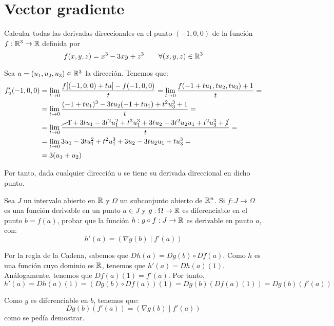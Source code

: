 \section{Vector gradiente}

\begin{ejercicio}
    Calcular todas las derivadas direccionales en el punto $(-1,0,0)$ de la función $f:\mathbb{R}^3\to \mathbb{R}$ definida por
    \begin{equation*}
        f(x,y,z) = x^3  -3xy + z^3 \qquad \forall (x,y,z)\in \mathbb{R}^3
    \end{equation*}

    Sea $u=(u_1,u_2,u_3)\in \mathbb{R}^3$ la dirección. Tenemos que:
    \begin{equation*}\begin{split}
        f'_u(-1,0,0) &= \lim_{t\to 0} \frac{f[(-1,0,0) + tu] - f(-1,0,0)}{t}
        = \lim_{t\to 0} \frac{f(-1+tu_1, tu_2, tu_3) +1}{t}
        =\\&= \lim_{t\to 0} \frac{(-1+tu_1)^3-3tu_2(-1+tu_1) + t^2u_3^3 +1}{t}
        =\\&= \lim_{t\to 0} \frac{\cancel{-1}+3tu_1 - 3t^2u_1^2 +t^3u_1^3 +3tu_2 -3t^2u_2u_1 + t^2u_3^3 +\cancel{1}}{t}
        =\\&= \lim_{t\to 0} 3u_1 - 3tu_1^2 +t^2u_1^3 +3u_2 -3tu_2u_1 + tu_3^3
        =\\&= 3(u_1 + u_2)
    \end{split}\end{equation*}

    Por tanto, dada cualquier dirección $u$ se tiene su derivada direccional en dicho punto.
\end{ejercicio}

\begin{ejercicio}
    Sea $J$ un intervalo abierto en $\mathbb{R}$ y $\Omega$ un subconjunto abierto de $\mathbb{R}^n$. Si $f:J\to \Omega$ es una función derivable en un punto $a\in J$ y $g:\Omega\to \mathbb{R}$ es diferenciable en el punto $b=f(a)$, probar que la función $h:g\circ f:J\to \mathbb{R}$ es derivable en punto $a$, con:
    \begin{equation*}
        h'(a) = (\nabla g(b)\mid f'(a))
    \end{equation*}

    Por la regla de la Cadena, sabemos que $Dh(a) = Dg(b)\circ Df(a)$.
    Como $h$ es una función cuyo dominio es $\mathbb{R}$, tenemos que $h'(a)=Dh(a)(1)$. Análogamente, tenemos que $Df(a)(1) = f'(a)$. Por tanto,
    \begin{equation*}
        h'(a) = Dh(a)(1) = (Dg(b)\circ Df(a))(1) = Dg(b)(Df(a)(1)) = Dg(b)(f'(a))
    \end{equation*}

    Como $g$ es diferenciable en $b$, tenemos que:
    \begin{equation*}
        Dg(b)(f'(a)) = \left(\nabla g(b)\mid f'(a)\right)
    \end{equation*}
    como se pedía demostrar.
\end{ejercicio}

